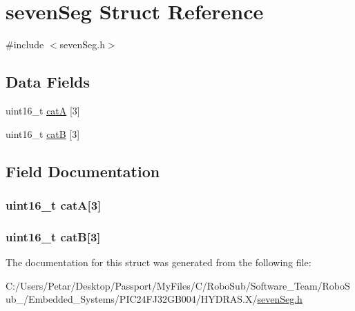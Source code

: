 \hypertarget{structseven_seg}{}\section{seven\+Seg Struct Reference}
\label{structseven_seg}


{\ttfamily \#include $<$seven\+Seg.\+h$>$}

\subsection*{Data Fields}
\begin{DoxyCompactItemize}
\item 
uint16\+\_\+t \hyperlink{structseven_seg_a42804d35182ea0e4b092ebffb25b089b}{cat\+A} \mbox{[}3\mbox{]}
\item 
uint16\+\_\+t \hyperlink{structseven_seg_a6ef82c71b032d66f75aa06337b5aa62d}{cat\+B} \mbox{[}3\mbox{]}
\end{DoxyCompactItemize}


\subsection{Field Documentation}
\hypertarget{structseven_seg_a42804d35182ea0e4b092ebffb25b089b}{}
\subsubsection[{cat\+A}]{\setlength{\rightskip}{0pt plus 5cm}uint16\+\_\+t cat\+A\mbox{[}3\mbox{]}}\label{structseven_seg_a42804d35182ea0e4b092ebffb25b089b}
\hypertarget{structseven_seg_a6ef82c71b032d66f75aa06337b5aa62d}{}
\subsubsection[{cat\+B}]{\setlength{\rightskip}{0pt plus 5cm}uint16\+\_\+t cat\+B\mbox{[}3\mbox{]}}\label{structseven_seg_a6ef82c71b032d66f75aa06337b5aa62d}


The documentation for this struct was generated from the following file\+:\begin{DoxyCompactItemize}
\item 
C\+:/\+Users/\+Petar/\+Desktop/\+Passport/\+My\+Files/\+C/\+Robo\+Sub/\+Software\+\_\+\+Team/\+Robo\+Sub\+\_/\+Embedded\+\_\+\+Systems/\+P\+I\+C24\+F\+J32\+G\+B004/\+H\+Y\+D\+R\+A\+S.\+X/\hyperlink{seven_seg_8h}{seven\+Seg.\+h}\end{DoxyCompactItemize}
